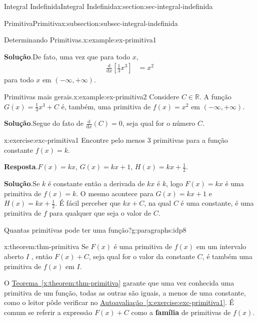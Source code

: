 \documentclass[oneside,10pt,]{article}
\newcommand{\blocktitlefont}{\relax}
\newcommand{\xreffont}{\relax}
\newcommand{\terminology}[1]{\textbf{#1}}
\numberwithin{equation}{section}
\newcommand{\dd}{\mathrm{d}}
\newcommand{\amp}{&}
\begin{document}
\begin{sectionptx}{Integral Indefinida}{}{Integral Indefinida}{}{}{x:section:sec-integral-indefinida}
\begin{subsectionptx}{Primitiva}{}{Primitiva}{}{}{x:subsection:subsec-integral-indefinida}
\begin{example}{Determinando Primitivas.}{x:example:ex-primitiva1}
\par\smallskip%
\noindent\textbf{\blocktitlefont Solução}.\hypertarget{g:solution:idp4}{}\quad{}De fato, uma vez que para todo \(x\),%
\begin{align*}
\frac{\dd}{\dd x}\left[\frac{1}{3}x^3\right]\amp = x^2
\end{align*}
para todo \(x\) em \((-\infty, +\infty)\).%
\end{example}
\begin{example}{Primitivas mais gerais.}{x:example:ex-primitiva2}%
\fa{} Considere \(C \in \mathbb{R}\). A função \(G(x)= \frac{1}{3}x^3 + C\) é, também, uma primitiva de \(f(x)=x^2\) em \((-\infty, +\infty)\).%
\par\smallskip%
\noindent\textbf{\blocktitlefont Solução}.\hypertarget{g:solution:idp5}{}\quad{}Segue do fato de \(\frac{\dd}{\dd x}(C)=0\), seja qual for o número \(C\).%
\end{example}
\begin{inlineexercise}{}{x:exercise:exc-primitiva1}%
Encontre pelo menos 3 primitivas para a função constante \(f(x)=k\).%
\par\smallskip%
\noindent\textbf{\blocktitlefont Resposta}.\hypertarget{g:answer:idp6}{}\quad{}\(F(x)=kx\), \(G(x)=kx +1\), \(H(x)=kx+\frac{1}{2}\).%
\par\smallskip%
\noindent\textbf{\blocktitlefont Solução}.\hypertarget{g:solution:idp7}{}\quad{}Se \(k\) é constante então a derivada de \(kx\) é \(k\), logo \(F(x)=kx\) é uma primitiva de \(f(x)=k\). O mesmo acontece  para \(G(x)=kx +1\) e \(H(x)=kx+\frac{1}{2}\). É fácil perceber que \(kx+C\), na qual \(C\) é uma constante, é uma primitiva de \(f\) para qualquer que seja o valor de \(C\).%
\end{inlineexercise}%
\begin{paragraphs}{Quantas  primitivas pode ter uma função?}{g:paragraphs:idp8}%
\end{paragraphs}%
\begin{theorem}{}{}{x:theorem:thm-primitiva}%
Se  \(F(x)\) é uma primitiva de \(f(x)\) em um intervalo aberto \(I\) , então \(F(x) + C\), seja qual for o valor da constante \(C\), é também uma primitiva de \(f(x)\) em \(I\).%
\end{theorem}
O  \hyperref[x:theorem:thm-primitiva]{Teorema~{\xreffont\ref{x:theorem:thm-primitiva}}} garante que uma vez conhecida uma primitiva de um função, todas as outras são iguais, a menos de uma constante, como o leitor pôde verificar no \hyperref[x:exercise:exc-primitiva1]{Autoavaliação~{\xreffont\ref{x:exercise:exc-primitiva1}}}. É comum se referir a expressão \(F(x)+C\) como a \terminology{família}  de primitivas de \(f(x)\).%

\end{subsectionptx}
\end{sectionptx}
\end{document}
